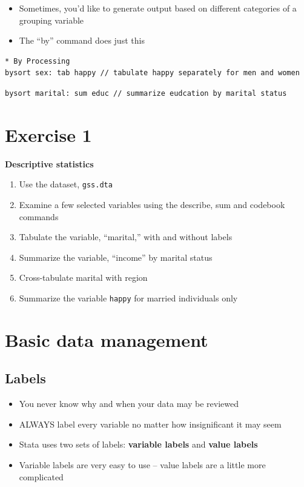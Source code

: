 \documentclass[]{book}
\providecommand{\tightlist}{%
  \setlength{\itemsep}{0pt}\setlength{\parskip}{0pt}}
\begin{document}
\begin{itemize}
\tightlist
\item
  Sometimes, you'd like to generate output based on different categories
  of a grouping variable
\item
  The ``by'' command does just this
\end{itemize}

\begin{verbatim}
* By Processing
bysort sex: tab happy // tabulate happy separately for men and women
\end{verbatim}

\begin{verbatim}
bysort marital: sum educ // summarize eudcation by marital status
\end{verbatim}

\section{Exercise 1}\label{exercise-1-6}

\textbf{Descriptive statistics}

\begin{enumerate}
\def\labelenumi{\arabic{enumi}.}
\tightlist
\item
  Use the dataset, \texttt{gss.dta}
\item
  Examine a few selected variables using the describe, sum and codebook
  commands
\item
  Tabulate the variable, ``marital,'' with and without labels
\item
  Summarize the variable, ``income'' by marital status
\item
  Cross-tabulate marital with region
\item
  Summarize the variable \texttt{happy} for married individuals only
\end{enumerate}

\section{Basic data management}\label{basic-data-management}

\subsection{Labels}\label{labels}

\begin{itemize}
\tightlist
\item
  You never know why and when your data may be reviewed
\item
  ALWAYS label every variable no matter how insignificant it may seem
\item
  Stata uses two sets of labels: \textbf{variable labels} and
  \textbf{value labels}
\item
  Variable labels are very easy to use -- value labels are a little more
  complicated
\end{itemize}
\end{document}
